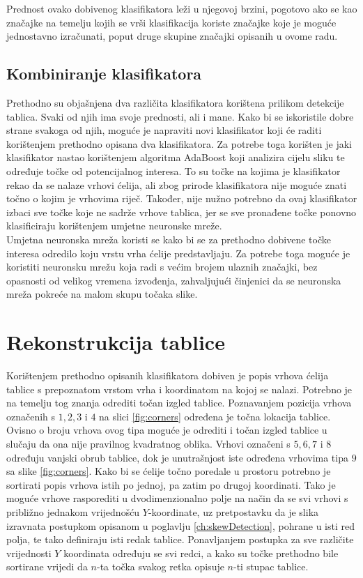 \documentclass[times, utf8, zavrsni, numeric]{fer}
\begin{document}
Prednost ovako dobivenog klasifikatora leži u njegovoj brzini, pogotovo ako se kao značajke na temelju kojih se vrši klasifikacija koriste značajke koje je moguće jednostavno izračunati, poput druge skupine značajki opisanih u ovome radu.


\subsection{Kombiniranje klasifikatora}
Prethodno su objašnjena dva različita klasifikatora korištena prilikom detekcije tablica.
Svaki od njih ima svoje prednosti, ali i mane.
Kako bi se iskoristile dobre strane svakoga od njih, moguće je napraviti novi klasifikator koji će raditi korištenjem prethodno opisana dva klasifikatora.
Za potrebe toga korišten je jaki klasifikator nastao korištenjem algoritma AdaBoost koji analizira cijelu sliku te određuje točke od potencijalnog interesa. 
To su točke na kojima je klasifikator rekao da se nalaze vrhovi ćelija, ali zbog prirode klasifikatora nije moguće znati točno o kojim je vrhovima riječ.
Također, nije nužno potrebno da ovaj klasifikator izbaci sve točke koje ne sadrže vrhove tablica, jer se sve pronađene točke ponovno klasificiraju korištenjem umjetne neuronske mreže.\\

Umjetna neuronska mreža koristi se kako bi se za prethodno dobivene točke interesa odredilo koju vrstu vrha ćelije predstavljaju.
Za potrebe toga moguće je koristiti neuronsku mrežu koja radi s većim brojem ulaznih značajki, bez opasnosti od velikog vremena izvođenja, zahvaljujući činjenici da se neuronska mreža pokreće na malom skupu točaka slike. 

\section{Rekonstrukcija tablice}
Korištenjem prethodno opisanih klasifikatora dobiven je popis vrhova ćelija tablice s prepoznatom vrstom vrha i koordinatom na kojoj se nalazi.
Potrebno je na temelju tog znanja odrediti točan izgled tablice. 
Poznavanjem pozicija vrhova označenih s $1, 2, 3$ i $4$ na slici \ref{fig:corners} određena je točna lokacija tablice. 
Ovisno o broju vrhova ovog tipa moguće je odrediti i točan izgled tablice u slučaju da ona nije pravilnog kvadratnog oblika.
Vrhovi označeni s $5, 6, 7$ i $8$ određuju vanjski obrub tablice, dok je unutrašnjost iste određena vrhovima tipa $9$ sa slike \ref{fig:corners}.
Kako bi se ćelije točno poredale u prostoru potrebno je sortirati popis vrhova istih po jednoj, pa zatim po drugoj koordinati.
Tako je moguće vrhove rasporediti u dvodimenzionalno polje na način da se svi vrhovi s približno jednakom vrijednošću $Y$-koordinate, uz pretpostavku da je slika izravnata postupkom opisanom u poglavlju \ref{ch:skewDetection}, pohrane u isti red polja, te tako definiraju isti redak tablice.
Ponavljanjem postupka za sve različite vrijednosti $Y$ koordinata određuju se svi redci, a kako su točke prethodno bile sortirane vrijedi da $n$-ta točka svakog retka opisuje $n$-ti stupac tablice.
\end{document}
